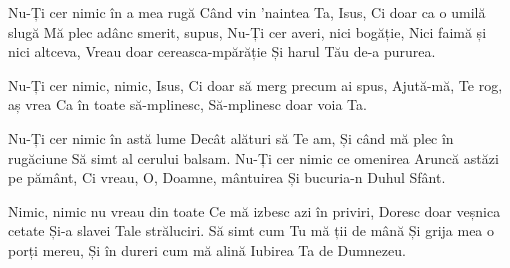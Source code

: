 \beginverse
Nu-Ți cer nimic în a mea rugă
Când vin 'naintea Ta, Isus,
Ci doar ca o umilă slugă
Mă plec adânc smerit, supus,
Nu-Ți cer averi, nici bogăție,
Nici faimă și nici altceva,
Vreau doar cereasca-mpărăție
Și harul Tău de-a pururea.
\endverse

\beginchorus
Nu-Ți cer nimic, nimic, Isus,
Ci doar să merg precum ai spus,
Ajută-mă, Te rog, aș vrea
Ca în toate să-mplinesc,
Să-mplinesc doar voia Ta.
\endchorus

\beginverse
Nu-Ți cer nimic în astă lume
Decât alături să Te am,
Și când mă plec în rugăciune
Să simt al cerului balsam.
Nu-Ți cer nimic ce omenirea
Aruncă astăzi pe pământ,
Ci vreau, O, Doamne, mântuirea
Și bucuria-n Duhul Sfânt.
\endverse

\beginverse
Nimic, nimic nu vreau din toate
Ce mă izbesc azi în priviri,
Doresc doar veșnica cetate
Și-a slavei Tale străluciri.
Să simt cum Tu mă ții de mână
Și grija mea o porți mereu,
Și în dureri cum mă alină
Iubirea Ta de Dumnezeu.
\endverse
\endsong